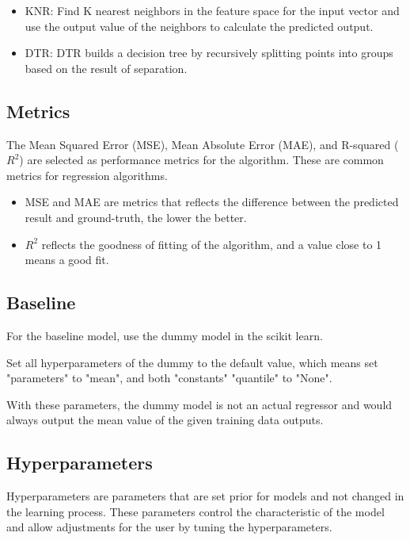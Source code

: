 \documentclass[a4paper]{article}
\begin{document}
\begin{itemize}
    \item KNR: Find K nearest neighbors in the feature space for the input vector and use the output value of the neighbors to calculate the predicted output.
    \item DTR: DTR builds a decision tree by recursively splitting points into groups based on the result of separation. 
\end{itemize}

\subsection{Metrics}

The Mean Squared Error (MSE), Mean Absolute Error (MAE), and R-squared ($R^2$) are selected as performance metrics for the algorithm. These are common metrics for regression algorithms.

\begin{itemize}
    \item MSE and MAE are metrics that reflects the difference between the predicted result and ground-truth, the lower the better.
    \item $R^2$ reflects the goodness of fitting of the algorithm, and a value close to 1 means a good fit. 
\end{itemize}

\subsection{Baseline}

For the baseline model, use the dummy model in the scikit learn. 

Set all hyperparameters of the dummy to the default value, which means set "parameters" to "mean", and both "constants" "quantile" to "None".

With these parameters, the dummy model is not an actual regressor and would always output the mean value of the given training data outputs. 

\subsection{Hyperparameters}


Hyperparameters are parameters that are set prior for models and not changed in the learning process. These parameters control the characteristic of the model and allow adjustments for the user by tuning the hyperparameters.
\end{document}
